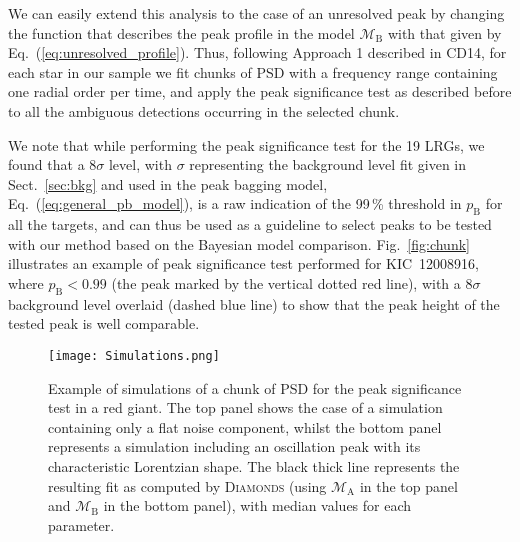 \documentclass[structabstract]{aa}
\newcommand{\model}{\mathcal{M}}
\newcommand{\diamonds}{\textsc{D\large{iamonds}}}
\newcommand{\kic}{KIC~12008916}
\begin{document}
We can easily extend this analysis to the case of an unresolved peak by changing the function that describes the peak profile in the model $\model_\mathrm{B}$ with that given by Eq.~(\ref{eq:unresolved_profile}). Thus, following Approach 1 described in CD14, for each star in our sample we fit chunks of PSD with a frequency range containing one radial order per time, and apply the peak significance test as described before to all the ambiguous detections occurring in the selected chunk. 

We note that while performing the peak significance test for the 19 LRGs, we found that a 8$\sigma$ level, with $\sigma$ representing the background level fit given in Sect.~\ref{sec:bkg} and used in the peak bagging model, Eq.~(\ref{eq:general_pb_model}), is a raw indication of the 99\,\% threshold in $p_\mathrm{B}$ for all the targets, and can thus be used as a guideline to select peaks to be tested with our method based on the Bayesian model comparison. Fig.~\ref{fig:chunk} illustrates an example of peak significance test performed for \kic, where $p_\mathrm{B} < 0.99$ (the peak marked by the vertical dotted red line), with a $8\sigma$ background level overlaid (dashed blue line) to show that the peak height of the tested peak is well comparable. 

\begin{figure}
   \centering
   \texttt{[image: Simulations.png]}
      \caption{Example of simulations of a chunk of PSD for the peak significance test in a red giant. The top panel shows the case of a simulation containing only a flat noise component, whilst the bottom panel represents a simulation including an oscillation peak with its characteristic Lorentzian shape. The black thick line represents the resulting fit as computed by \diamonds\,\,(using $\model_\mathrm{A}$ in the top panel and $\model_\mathrm{B}$ in the bottom panel), with median values for each parameter. }
    \label{fig:sim}
\end{figure}
\end{document}
